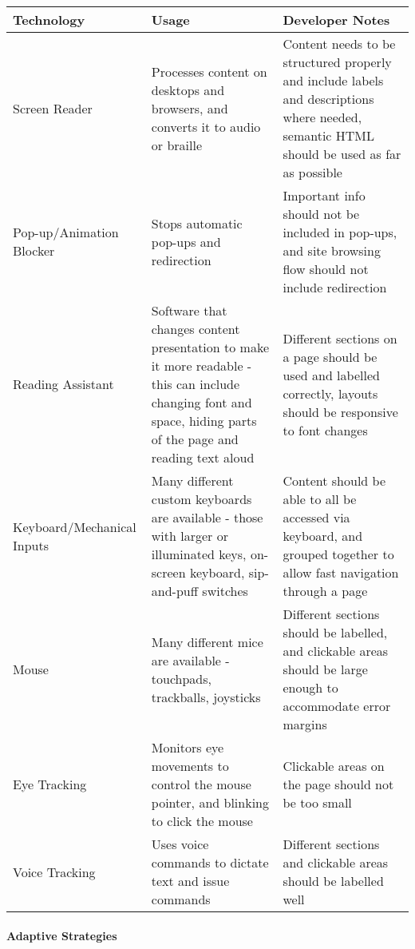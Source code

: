 \documentclass[ %
                    author={Aleena Baig},
                supervisor={Dr Simon Lock},
                    degree={BSc},
                     title={On Making Web Accessible Graphs},
                  subtitle={},
                      year={2019} ]{dissertation}
\begin{document}
\begin{center}
\begin{tabular}{|p{3cm}|p{5cm}|p{5cm}|} 
 \hline
 Technology & Usage & Developer Notes \\ [0.5ex] 
 \hline \hline
 Screen Reader & Processes content on desktops and browsers, and converts it to audio or braille & Content needs to be structured properly and include labels and descriptions where needed, semantic HTML should be used as far as possible \\ 
 \hline
 Pop-up/Animation Blocker & Stops automatic pop-ups and redirection & Important info should not be included in pop-ups, and site browsing flow should not include redirection \\
 \hline
 Reading Assistant & Software that changes content presentation to make it more readable - this can include changing font and space, hiding parts of the page and reading text aloud & Different sections on a page should be used and labelled correctly, layouts should be responsive to font changes \\
 \hline
 Keyboard/Mechanical Inputs & Many different custom keyboards are available - those with larger or illuminated keys, on-screen keyboard, sip-and-puff switches  & Content should be able to all be accessed via keyboard, and grouped together to allow fast navigation through a page \\
 \hline
 Mouse & Many different mice are available - touchpads, trackballs, joysticks & Different sections should be labelled, and clickable areas should be large enough to accommodate error margins\\
 \hline
 Eye Tracking & Monitors eye movements to control the mouse pointer, and blinking to click the mouse & Clickable areas on the page should not be too small \\
 \hline
 Voice Tracking & Uses voice commands to dictate text and issue commands & Different sections and clickable areas should be labelled well \\ [1ex] 
 \hline
\end{tabular}
\end{center}


\paragraph{Adaptive Strategies}
\end{document}
